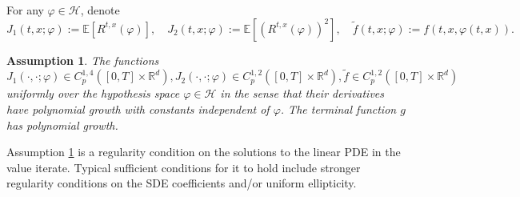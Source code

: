 \documentclass[twoside,11pt]{article}
\newcommand{\E}{\mathbb{E}}
\newcommand{\R}{\mathbb{R}}
\newtheorem{assumption}{Assumption}
\newcommand{\1}{\mathbf{1}}
\numberwithin{equation}{section}
\begin{document}
For any $\varphi \in \mathcal{H} $, denote
\begin{equation}
    J_1(t, x; \varphi) := \E \left[ R^{t,x}(\varphi) \right],\quad J_2(t,x;\varphi):= \E[(R^{t,x}(\varphi))^2], \quad \tilde f(t,x;\varphi) := f(t,x,\varphi(t,x)).
\end{equation}

\begin{assumption}
\label{assum: reward and f regularity}
The functions $J_1(\cdot, \cdot; \varphi)\in C_p^{1,4}([0,T]\times\R^d), J_2(\cdot,\cdot;\varphi)\in C_p^{1,2}([0,T]\times \R^d), \tilde f \in C_p^{1,2}([0,T]\times \R^d)$ uniformly over the hypothesis space $ \varphi\in \mathcal{H}$ in the sense that their derivatives have polynomial growth with constants
independent of $\varphi$. The terminal function $g$ has polynomial growth.
\end{assumption}


Assumption \ref{assum: reward and f regularity} is a regularity condition on the solutions to the linear PDE in the value iterate. Typical sufficient conditions for it to hold include stronger regularity conditions on the SDE coefficients and/or uniform ellipticity.
\end{document}
